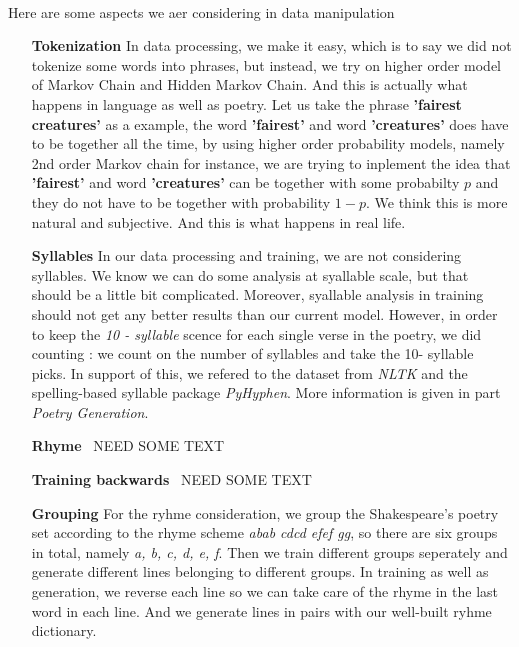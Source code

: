 %
\paragraph{}
Here are some aspects we aer considering in data manipulation
\begin{enumerate}
	\item [\textbf{Tokenization}] In data processing, we make it easy, which is to say we did not tokenize some words into phrases, but instead, we try on higher order model of Markov Chain and Hidden Markov Chain. And this is actually what happens in language as well as poetry. Let us take the phrase \textbf{'fairest creatures'} as a example, the word \textbf{'fairest'} and word \textbf{'creatures'} does have to be together all the time, by using higher order probability models, namely 2nd order Markov chain for instance, we are trying to inplement the idea that \textbf{'fairest'} and word \textbf{'creatures'} can be together with some probabilty $p$ and they do not have to be together with probability $1-p$. We think this is more natural and subjective. And this is what happens in real life.
	\item [\textbf{Syllables}] In our data processing and training, we are not considering syllables. We know we can do some analysis at syallable scale, but that should be a little bit complicated. Moreover, syallable analysis in training should not get any better results than our current model. However, in order to keep the \textit{10 - syllable} scence for each single verse in the poetry, we did counting : we count on the number of syllables and take the 10- syllable picks. In support of this, we refered to the dataset from \textit{NLTK} and the spelling-based syllable package \textit{PyHyphen}. More information is given in part \textit{Poetry Generation}.    
	\item [\textbf{Rhyme}]{\color{blue}\ NEED SOME TEXT}
	\item [\textbf{Training backwards}]{\color{blue}\ NEED SOME TEXT}
	\item [\textbf{Grouping}] For the ryhme consideration, we group the Shakespeare's poetry set according to the rhyme scheme \textit{abab cdcd efef gg}, so there are six groups in total, namely \textit{a, b, c, d, e, f}. Then we train different groups seperately and generate different lines belonging to different groups. In training as well as generation, we reverse each line so we can take care of the rhyme in the last word in each line. And we generate lines in pairs with our well-built ryhme dictionary.  
\end{enumerate}